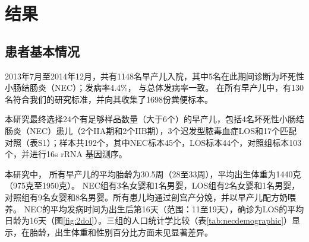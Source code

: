 \section{结果}
    \subsection{患者基本情况}
    2013年7月至2014年12月，共有1148名早产儿入院，其中5名在此期间诊断为坏死性小肠结肠炎（NEC）；发病率4.4\%， 与总体发病率一致\cite{rees2010national}。 在所有早产儿中，有130名符合我们的研究标准，并向其收集了1698份粪便标本。

    本研究最终选择24个有足够样品数量（大于6个）的早产儿，包括4名坏死性小肠结肠炎（NEC）患儿（2个IIA期和2个IIB期），3个迟发型脓毒血症LOS和17个匹配对照（表S1）；样本共192个，其中NEC标本45个，LOS标本44个，对照组标本103个，并进行16s rRNA 基因测序。

    本研究中， 所有早产儿的平均胎龄为30.5周（28至33周），平均出生体重为1440克（975克至1950克）。 NEC组有3名女婴和1名男婴，LOS组有2名女婴和1名男婴，对照组有9名女婴和8名男婴。所有患儿均通过剖宫产分娩，并以早产儿配方奶喂养。 NEC的平均发病时间为出生后第16天（范围：11至19天），确诊为LOS的平均日龄为16天（图\ref{fig:2dol}）。三组的人口统计学比较（表\ref{tab:necdemographic}）显示，在胎龄，出生体重和性别百分比方面未见显著差异。

